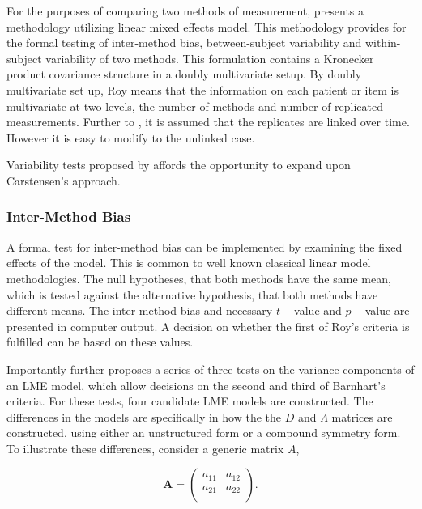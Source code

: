 \documentclass[12pt, a4paper]{report}
\theoremstyle{plain}
\theoremstyle{definition}
\theoremstyle{remark}
\begin{document}
	
	For the purposes of comparing two methods of measurement, \citet{ARoy2009} presents a methodology utilizing linear mixed effects model. This methodology provides for the formal testing of inter-method bias, between-subject variability and within-subject variability of two methods. This formulation contains a Kronecker product covariance structure in a doubly multivariate setup. By doubly multivariate set up, Roy means that the information on each patient or item is multivariate at two levels, the number of methods and number of replicated measurements. Further to \citet{lam}, it is assumed that the replicates are linked over time. However it is easy to modify to the unlinked case.
	
	
	\bigskip
	Variability tests proposed by \citet{ARoy2009} affords the opportunity to expand upon Carstensen's approach.
	
	






\subsubsection{Inter-Method Bias}
	
	
	A formal test for inter-method bias can be implemented by examining the fixed effects of the model. This is common to well known classical linear model methodologies. The null hypotheses, that both methods have the same mean, which is tested against the alternative hypothesis, that both methods have different means.
	The inter-method bias and necessary $t-$value and $p-$value are presented in computer output. A decision on whether the first of Roy's criteria is fulfilled can be based on these values.
	
	Importantly \citet{ARoy2009} further proposes a series of three tests on the variance components of an LME model, which allow decisions on the second and third of Barnhart's criteria. For these tests, four candidate LME models are constructed. The differences in the models are specifically in how the the $D$ and $\Lambda$ matrices are constructed, using either an unstructured form or a compound symmetry form. To illustrate these differences, consider a generic matrix $A$,
	
	\[
	\boldsymbol{A} = \left( \begin{array}{cc}
	a_{11} & a_{12}  \\
	a_{21} & a_{22}  \\
	\end{array}\right).
	\]
	
\end{document}
